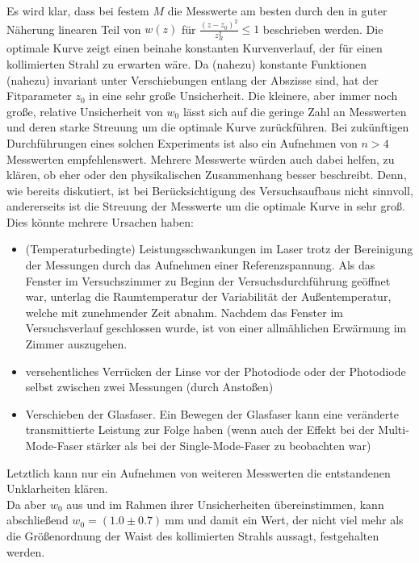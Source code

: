 \documentclass[11pt,a4paper,oneside]{scrartcl}
\begin{document}
Es wird klar, dass bei festem $M$ die Messwerte am besten durch den in guter Näherung linearen Teil von $w(z)$ für $\frac{(z-z_0)^2}{z_R^2}\leq1$ beschrieben werden. Die optimale Kurve zeigt einen beinahe konstanten Kurvenverlauf, der für einen kollimierten Strahl zu erwarten wäre. Da (nahezu) konstante Funktionen (nahezu) invariant unter Verschiebungen entlang der Abszisse sind, hat der Fitparameter $z_0$ in  eine sehr große Unsicherheit. Die kleinere, aber immer noch große, relative Unsicherheit von $w_0$ lässt sich auf die geringe Zahl an Messwerten und deren starke Streuung um die optimale Kurve zurückführen. Bei zukünftigen Durchführungen eines solchen Experiments ist also ein Aufnehmen von $n>4$ Messwerten empfehlenswert. Mehrere Messwerte würden auch dabei helfen, zu klären, ob eher  oder  den physikalischen Zusammenhang besser beschreibt. Denn, wie bereits diskutiert, ist  bei Berücksichtigung des Versuchsaufbaus nicht sinnvoll, andererseits ist die Streuung der Messwerte um die optimale Kurve in  sehr groß. Dies könnte mehrere Ursachen haben:
\begin{itemize}
\item (Temperaturbedingte) Leistungsschwankungen im Laser trotz der Bereinigung der Messungen durch das Aufnehmen einer Referenzspannung. Als das Fenster im Versuchszimmer zu Beginn der Versuchsdurchführung geöffnet war, unterlag die Raumtemperatur der Variabilität der Außentemperatur, welche mit zunehmender Zeit abnahm. Nachdem das Fenster im Versuchsverlauf geschlossen wurde, ist von einer allmählichen Erwärmung im Zimmer auszugehen. 
\item versehentliches Verrücken der Linse vor der Photodiode oder der Photodiode selbst zwischen zwei Messungen (durch Anstoßen)
\item Verschieben der Glasfaser. Ein Bewegen der Glasfaser kann eine veränderte transmittierte Leistung zur Folge haben (wenn auch der Effekt bei der Multi-Mode-Faser stärker als bei der Single-Mode-Faser zu beobachten war)
\end{itemize}
Letztlich kann nur ein Aufnehmen von weiteren Messwerten die entstandenen Unklarheiten klären.\\
Da aber $w_0$ aus  und  im Rahmen ihrer Unsicherheiten übereinstimmen, kann abschließend $w_0=(1.0\pm0.7)\ \mathrm{mm}$ und damit ein Wert, der nicht viel mehr als die Größenordnung der Waist des kollimierten Strahls aussagt, festgehalten werden. 
\end{document}
